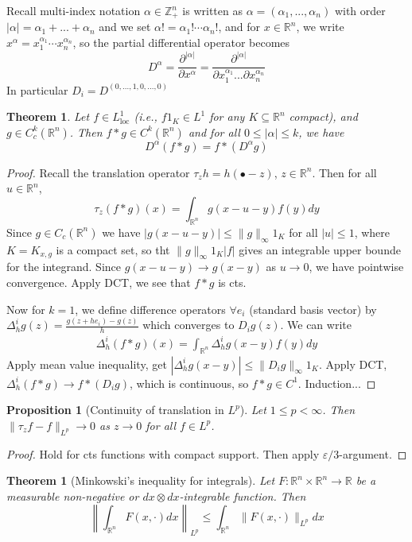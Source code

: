 \documentclass{article}
\theoremstyle{definition}
\theoremstyle{remark}
\theoremstyle{plain}
\newtheorem{thm}[defn]{Theorem}
\newtheorem{prop}[defn]{Proposition}
\newcommand{\ZZ}{\mathbb{Z}}
\newcommand{\RR}{\mathbb{R}}
\begin{document}
Recall multi-index notation $\alpha\in\ZZ_+^n$ is written as $\alpha=(\alpha_1,...,\alpha_n)$ with order $|\alpha|=\alpha_1+...+\alpha_n$ and we set $\alpha!=\alpha_1!\cdots\alpha_n!$, and for $x\in\RR^n$, we write $x^\alpha=x_1^{\alpha_1}\cdots x_n^{\alpha_n}$, so the partial differential operator becomes
\[D^\alpha=\dfrac{\partial^{|\alpha|}}{\partial x^\alpha}=\dfrac{\partial^{|\alpha|}}{\partial x_1^{\alpha_1}...\partial x_n^{\alpha_n}}\]
In particular $D_i=D^{(0,...,1,0,...,0)}$
\begin{thm}
    Let $f\in L^1_{\text{loc}}$ (i.e., $f1_K\in L^1$ for any $K\subseteq\RR^n$ compact), and $g\in C^k_c(\RR^n)$. Then $f\ast g\in C^k(\RR^n)$ and for all $0\le|\alpha|\le k$, we have
    \[D^\alpha(f\ast g)=f\ast(D^\alpha g)\]
\end{thm}
\begin{proof}
    Recall the translation operator $\tau_zh=h(\bullet-z)$, $z\in\RR^n$. Then for all $u\in\RR^n$,
    \[\tau_z(f\ast g)(x)=\int_{\RR^n}g(x-u-y)f(y)dy\]
    Since $g\in C_c(\RR^n)$ we have $|g(x-u-y)|\le\|g\|_\infty1_K$ for all $|u|\le 1$, where $K=K_{x,g}$ is a compact set, so tht $\|g\|_\infty1_K|f|$ gives an integrable upper bounde for the integrand. Since $g(x-u-y)\to g(x-y)$ as $u\to 0$, we have pointwise convergence. Apply DCT, we see that $f\ast g$ is cts.

    Now for $k=1$, we define difference operators $\forall e_i$ (standard basis vector) by $\Delta^i_hg(z)=\frac{g(z+he_i)-g(z)}{h}$ which converges to $D_ig(z)$. We can write
    \begin{align*}
        \Delta_h^i(f\ast g)(x)=\int_{\RR^n}\Delta_h^ig(x-y)f(y)dy
    \end{align*}
    Apply mean value inequality, get $|\Delta_h^ig(x-y)|\le\|D_ig\|_\infty1_K$. Apply DCT, $\Delta_h^i(f\ast g)\to f\ast(D_ig)$, which is continuous, so $f\ast g\in C^1$. Induction...
\end{proof}
\begin{prop}[Continuity of translation in $L^p$]
    Let $1\le p<\infty$. Then $\|\tau_zf-f\|_{L^p}\to 0$ as $z\to 0$ for all $f\in L^p$.
\end{prop}
\begin{proof}
    Hold for cts functions with compact support. Then apply $\varepsilon/3$-argument.
\end{proof}
\begin{thm}[Minkowski's inequality for integrals]
    Let $F:\RR^n\times\RR^n\to\RR$ be a measurable non-negative or $dx\otimes dx$-integrable function. Then
    \[\left\|\int_{\RR^n}F(x,\cdot)dx\right\|_{L^p}\le\int_{\RR^n}\|F(x,\cdot)\|_{L^p}dx\]
\end{thm}
\end{document}

